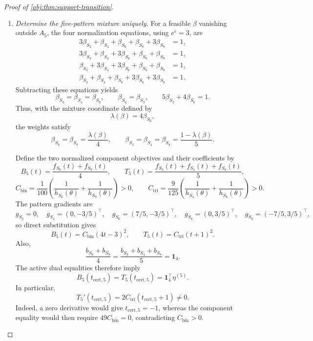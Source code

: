 \documentclass[11pt]{article}
\begin{document}
\begin{proof}[Proof of \cref{obj:thm:support-transition}]
\begin{enumerate}
\item \emph{Determine the five-pattern mixture uniquely.}
For a feasible \(\beta\) vanishing outside \(A_5\), the four normalization equations, using \(e^\varepsilon=3\), are
\[
\begin{aligned}
3\beta_{S_3}+\beta_{S_4}+\beta_{S_6}+\beta_{S_8}+3\beta_{S_9}&=1,\\
3\beta_{S_3}+\beta_{S_4}+3\beta_{S_6}+\beta_{S_8}+\beta_{S_9}&=1,\\
\beta_{S_3}+3\beta_{S_4}+3\beta_{S_6}+\beta_{S_8}+\beta_{S_9}&=1,\\
\beta_{S_3}+\beta_{S_4}+\beta_{S_6}+3\beta_{S_8}+3\beta_{S_9}&=1.
\end{aligned}
\]
Subtracting these equations yields
\[
\beta_{S_3}=\beta_{S_4}=\beta_{S_8},
\qquad
\beta_{S_6}=\beta_{S_9},
\qquad
5\beta_{S_3}+4\beta_{S_6}=1.
\]
Thus, with the mixture coordinate defined by
\[
\lambda(\beta)=4\beta_{S_6},
\]
the weights satisfy
\[
\beta_{S_6}=\beta_{S_9}=\frac{\lambda(\beta)}4,
\qquad
\beta_{S_3}=\beta_{S_4}=\beta_{S_8}
=\frac{1-\lambda(\beta)}5.
\]

Define the two normalized component objectives and their coefficients by
\[
B_5(t)=\frac{f_{S_6}(t)+f_{S_9}(t)}4,
\qquad
T_5(t)=\frac{f_{S_3}(t)+f_{S_4}(t)+f_{S_8}(t)}5,
\]
\[
C_{\mathrm{bin}}=\frac1{100}
 \left(\frac1{h_{S_6}(\theta)}+\frac1{h_{S_9}(\theta)}\right)>0,
\qquad
C_{\mathrm{tri}}=\frac9{125}
 \left(\frac1{h_{S_4}(\theta)}+\frac1{h_{S_8}(\theta)}\right)>0.
\]
The pattern gradients are
\[
g_{S_3}=0,\quad
g_{S_4}=(0,-3/5)^\top,\quad
g_{S_6}=(7/5,-3/5)^\top,\quad
g_{S_8}=(0,3/5)^\top,\quad
g_{S_9}=(-7/5,3/5)^\top,
\]
so direct substitution gives
\[
B_5(t)=C_{\mathrm{bin}}(4t-3)^2,
\qquad
T_5(t)=C_{\mathrm{tri}}(t+1)^2.
\]
Also,
\[
\frac{b_{S_6}+b_{S_9}}4
=\frac{b_{S_3}+b_{S_4}+b_{S_8}}5
=\mathbf1_4.
\]
The active dual equalities therefore imply
\[
B_5(t_{\mathrm{cert},5})
=T_5(t_{\mathrm{cert},5})
=\mathbf1_4^\top\eta^{(5)}.
\]
In particular,
\[
T_5'(t_{\mathrm{cert},5})
=2C_{\mathrm{tri}}(t_{\mathrm{cert},5}+1)\ne0.
\]
Indeed, a zero derivative would give \(t_{\mathrm{cert},5}=-1\), whereas the component equality would then require
\(49C_{\mathrm{bin}}=0\), contradicting \(C_{\mathrm{bin}}>0\).


\end{enumerate}
\end{proof}
\end{document}
